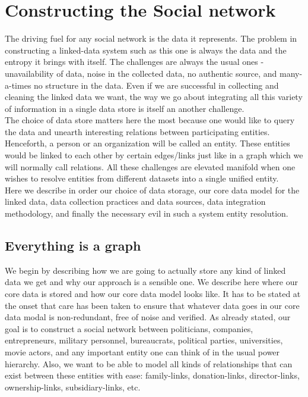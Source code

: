 \chapter{Constructing the Social network}

The driving fuel for any social network is the data it represents. The problem in constructing a linked-data system such as this one is always the data and the entropy it brings with itself. The challenges are always the usual ones - unavailability of data, noise in the collected data, no authentic source, and many-a-times no structure in the data. Even if we are successful in collecting and cleaning the linked data we want, the way we go about integrating all this variety of information in a single data store is itself an another challenge. \\

The choice of data store matters here the most because one would like to query the data and unearth interesting relations between participating entities. Henceforth, a person or an organization will be called an entity. These entities would be linked to each other by certain edges/links just like in a graph which we will normally call relations. All these challenges are elevated manifold when one wishes to resolve entities from different datasets into a single unified entity. \\

Here we describe in order our choice of data storage, our core data model for the linked data, data collection practices and data sources, data integration methodology, and finally the necessary evil in such a system entity resolution. \\

\section{Everything is a graph}

We begin by describing how we are going to actually store any kind of linked data we get and why our approach is a sensible one. We describe here where our core data is stored and how our core data model looks like. It has to be stated at the onset that care has been taken to ensure that
whatever data goes in our core data modal is non-redundant, free of noise and verified. As already stated, our goal is to construct a social network between politicians, companies, entrepreneurs, military personnel, bureaucrats, political parties, universities, movie actors, and any important entity one can think of in the usual power hierarchy. Also, we want to be able to model all kinds of relationships that can exist between these entities with ease: family-links, donation-links, director-links, ownership-links, subsidiary-links, etc. \\

